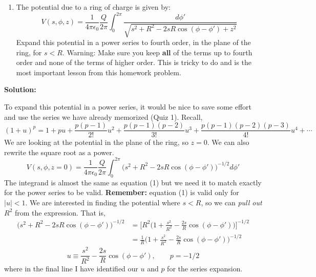 \documentclass[a4paper, 11pt]{article}
\newenvironment{solution}{%
	\begin{list}{}{%
			\setlength{\topsep}{0pt}%
			\setlength{\leftmargin}{0.5cm}%
			\setlength{\rightmargin}{0.5cm}%
			\setlength{\listparindent}{\parindent}%
			\setlength{\itemindent}{\parindent}%
			\setlength{\parsep}{\parskip}%
		}%
		\item[]}{\end{list}}
\begin{document}
\begin{enumerate}[leftmargin=0em, label=\textbf{\arabic*}.]
  \item The potential due to a ring of charge is given by:
    \[
      V(s,\phi,z) = \frac{1}{4\pi\epsilon_0}\frac{Q}{2\pi}\int_0^{2\pi}\frac{d\phi'}{\sqrt{s^2+R^2-2sR\cos(\phi-\phi')+z^2}}
    \]
    Expand this potential in a power series to fourth order, in the plane of the
    ring, for $s<R$. Warning: Make sure you keep \textbf{all} of the terms up to
    fourth order and none of the terms of higher order. This is tricky to do and
    is the most important lesson from this homework problem. \\
\end{enumerate}

\noindent\textbf{Solution:}
\begin{solution}
  \noindent To expand this potential in a power series, it would be nice to save
  some effort and use the series we have already memorized (Quiz 1). Recall,
  \begin{equation}
    (1+u)^p = 1+pu + \frac{p(p-1)}{2!}u^2+\frac{p(p-1)(p-2)}{3!}u^3+\frac{p(p-1)(p-2)(p-3)}{4!}u^4+ \cdots
  \end{equation}
  We are looking at the potential in the plane of the ring, so $z=0$. We can
  also rewrite the square root as a power.
  \begin{equation}
    V(s,\phi,z=0)=\frac{1}{4\pi\epsilon_0}\frac{Q}{2\pi}\int_0^{2\pi}\Big(s^2+R^2-2sR\cos(\phi-\phi')\Big)^{-1/2}d\phi'
  \end{equation}
  The integrand is almost the same as equation (1) but we need it to match
  exactly for the power series to be valid. \textbf{Remember:} equation (1) is
  valid only for $|u|<1$. We are interested in finding the potential where
  $s<R$, so we can \textit{pull out} $R^2$ from the expression. That is,
  \begin{align}
    \Big(s^2+R^2-2sR\cos(\phi-\phi')\Big)^{-1/2} &= \Big[R^2\Big(1+\frac{s^2}{R^2}-\frac{2s}{R}\cos(\phi-\phi')\Big)\Big]^{-1/2}\\
                                                 &= \frac{1}{R}\Big(1+\frac{s^2}{R^2}-\frac{2s}{R}\cos(\phi-\phi')\Big)^{-1/2} 
  \end{align}
  \begin{equation}
    u \equiv \frac{s^2}{R^2}-\frac{2s}{R}\cos(\phi-\phi'), \qquad p=-1/2
  \end{equation}
  where in the final line I have identified our $u$ and $p$ for the series
  expansion. \\
  

\end{solution}
\end{document}
